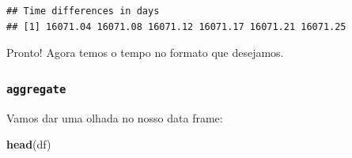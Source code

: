 \documentclass[]{book}
\newenvironment{Shaded}{\begin{snugshade}}{\end{snugshade}}
\newcommand{\KeywordTok}[1]{\textcolor[rgb]{0.13,0.29,0.53}{\textbf{#1}}}
\newcommand{\StringTok}[1]{\textcolor[rgb]{0.31,0.60,0.02}{#1}}
\newcommand{\OperatorTok}[1]{\textcolor[rgb]{0.81,0.36,0.00}{\textbf{#1}}}
\newcommand{\NormalTok}[1]{#1}
\theoremstyle{definition}
\theoremstyle{definition}
\theoremstyle{definition}
\theoremstyle{remark}
\begin{document}
\begin{verbatim}
## Time differences in days
## [1] 16071.04 16071.08 16071.12 16071.17 16071.21 16071.25
\end{verbatim}

\begin{Shaded}
\end{Shaded}

Pronto! Agora temos o tempo no formato que desejamos.

\subsubsection{\texorpdfstring{\texttt{aggregate}}{aggregate}}\label{aggregate}

Vamos dar uma olhada no nosso data frame:

\begin{Shaded}
\begin{Highlighting}[]
\KeywordTok{head}\NormalTok{(df)}
\end{Highlighting}
\end{Shaded}
\end{document}
